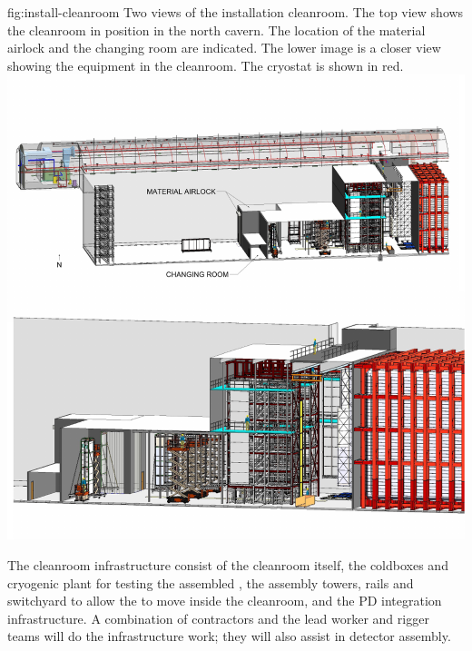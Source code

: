 \begin{dunefigure}{fig:install-cleanroom}
  {Two views of the installation cleanroom.  The top view shows the cleanroom in position in the north cavern. The location of the material airlock and the changing room are indicated. The lower image is a closer view showing the equipment in the cleanroom. The cryostat is shown in red.
  } 
\includegraphics[width=1.0\textwidth]{graphics/install-cleanroom.pdf}
\end{dunefigure}

The cleanroom infrastructure consist of the cleanroom itself, the coldboxes and cryogenic plant for testing the assembled , the assembly towers, rails and switchyard to allow the  to move inside the cleanroom, and the PD integration infrastructure. A combination of contractors and the lead worker and rigger teams will do the infrastructure work; they will also assist in detector assembly. 

